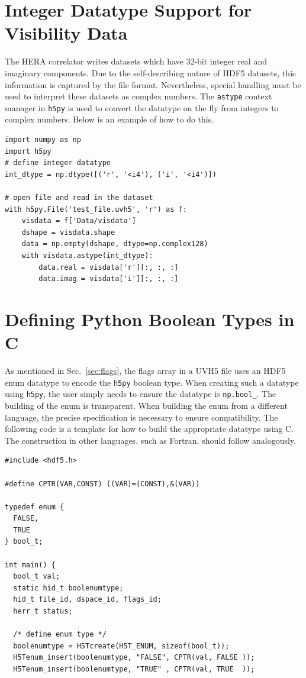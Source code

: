 \documentclass[11pt, oneside]{article}
\begin{document}
\begin{appendices}
\section{Integer Datatype Support for Visibility Data}
\label{appendix:integers}
The HERA correlator writes datasets which have 32-bit integer real and imaginary
components. Due to the self-describing nature of HDF5 datasets, this information
is captured by the file format. Nevertheless, special handling must be used to
interpret these datasets as complex numbers. The \verb+astype+ context manager
in \verb+h5py+ is used to convert the datatype on the fly from integers to
complex numbers. Below is an example of how to do this.

\begin{verbatim}
import numpy as np
import h5py
# define integer datatype
int_dtype = np.dtype([('r', '<i4'), ('i', '<i4')])

# open file and read in the dataset
with h5py.File('test_file.uvh5', 'r') as f:
    visdata = f['Data/visdata']
    dshape = visdata.shape
    data = np.empty(dshape, dtype=np.complex128)
    with visdata.astype(int_dtype):
        data.real = visdata['r'][:, :, :]
        data.imag = visdata['i'][:, :, :]
\end{verbatim}


\section{Defining Python Boolean Types in C}
\label{appendix:boolean}
As mentioned in Sec.~\ref{sec:flags}, the flags array in a UVH5 file uses an
HDF5 enum datatype to encode the \verb+h5py+ boolean type. When creating such a
datatype using \verb+h5py+, the user simply needs to ensure the datatype is
\verb+np.bool_+. The building of the enum is transparent. When building the enum
from a different language, the precise specification is necessary to ensure
compatibility. The following code is a template for how to build the appropriate
datatype using C. The construction in other languages, such as Fortran, should
follow analogously.
\begin{verbatim}
#include <hdf5.h>

#define CPTR(VAR,CONST) ((VAR)=(CONST),&(VAR))

typedef enum {
  FALSE,
  TRUE
} bool_t;

int main() {
  bool_t val;
  static hid_t boolenumtype;
  hid_t file_id, dspace_id, flags_id;
  herr_t status;

  /* define enum type */
  boolenumtype = H5Tcreate(H5T_ENUM, sizeof(bool_t));
  H5Tenum_insert(boolenumtype, "FALSE", CPTR(val, FALSE ));
  H5Tenum_insert(boolenumtype, "TRUE" , CPTR(val, TRUE  ));


\end{verbatim}
\end{appendices}
\end{document}

